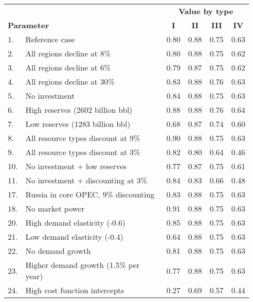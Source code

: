 \begin{tabular} {l l c c c c} \midrule \midrule 
 & &  \multicolumn{4}{c}{\textbf{Value by type}} \\ 
\multicolumn{2}{l}{\textbf{Parameter}}  & \textbf{I} & \textbf{II} & \textbf{III} & \textbf{IV} \\ 
\midrule 
1. & Reference case & 0.80 & 0.88 & 0.75 & 0.63 \\ 
2. & All regions decline at 8\% & 0.80 & 0.88 & 0.75 & 0.62 \\ 
3. & All regions decline at 6\% & 0.79 & 0.87 & 0.75 & 0.62 \\ 
4. & All regions decline at 30\% & 0.83 & 0.88 & 0.76 & 0.63 \\ 
5. & No investment & 0.84 & 0.88 & 0.75 & 0.63 \\ 
6. & High reserves (2602 billion bbl) & 0.88 & 0.88 & 0.76 & 0.64 \\ 
7. & Low reserves (1283 billion bbl) & 0.68 & 0.87 & 0.74 & 0.60 \\ 
8. & All resource types discount at 9\% & 0.90 & 0.88 & 0.75 & 0.63 \\ 
9. & All resource types discount at 3\% & 0.82 & 0.80 & 0.64 & 0.46 \\ 
10. & No investment + low reserves & 0.77 & 0.87 & 0.75 & 0.61 \\ 
11. & No investment + discounting at 3\% & 0.84 & 0.83 & 0.66 & 0.48 \\ 
17. & Russia in core OPEC, 9\% discounting & 0.83 & 0.88 & 0.75 & 0.63 \\ 
18. & No market power & 0.91 & 0.88 & 0.75 & 0.63 \\ 
20. & High demand elasticity (-0.6) & 0.85 & 0.88 & 0.75 & 0.63 \\ 
21. & Low demand elasticity (-0.4) & 0.64 & 0.88 & 0.75 & 0.63 \\ 
22. & No demand growth & 0.81 & 0.88 & 0.75 & 0.63 \\ 
23. & Higher demand growth (1.5\% per year) & 0.77 & 0.88 & 0.75 & 0.63 \\ 
24. & High cost function intercepts  & 0.27 & 0.69 & 0.57 & 0.44 \\ 
\midrule 
\end{tabular}